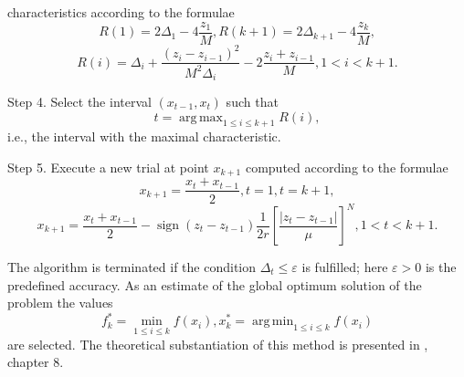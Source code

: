 \documentclass[procedia]{easychair}
\DeclareMathOperator*{\argmax}{arg\,max}
\DeclareMathOperator*{\argmin}{arg\,min}
\DeclareMathOperator{\sign}{sign}
\begin{document}
characteristics according to the formulae
\begin{equation}
\label{step3_1}
R(1)=2\Delta_1-4\dfrac{z_1}{M},R(k+1)=2\Delta_{k+1}-4\dfrac{z_k}{M},
\end{equation}
\begin{equation}
\label{step3_2}
R(i)=\Delta_i+\dfrac{(z_i-z_{i-1})^2}{M^2\Delta_i}-2\dfrac{z_i+z_{i-1}}{M},1<i<k+1.
\end{equation}
\par
Step 4. Select the interval \((x_{t-1}, x_t)\) such that
\begin{equation}
\label{step4}
t=\argmax_{1\leqslant i \leqslant k+1}R(i),
\end{equation}
i.e., the interval with the maximal characteristic.
\par
Step 5. Execute a new trial at point \(x_{k+1}\) computed according to the formulae
\begin{displaymath}
x_{k+1}=\dfrac{x_{t}+x_{t-1}}{2},t=1,t=k+1,
\end{displaymath}
\begin{equation}
\label{step5}
x_{k+1}=\dfrac{x_{t}+x_{t-1}}{2}-\sign(z_{t}-z_{t-1})\dfrac{1}{2r}\left[\dfrac{|z_{t}-z_{t-1}|}{\mu}\right]^N,1<t<k+1.
\end{equation}
\par
The algorithm is terminated if the condition \(\Delta_{t}\leqslant \varepsilon\) is fulfilled;
here \(\varepsilon>0\) is the predefined accuracy. As an estimate of the global optimum solution of the problem the values
\begin{equation}
f_k^*=\min_{1\leqslant i \leqslant k}f(x_i), x_k^*=\argmin_{1\leqslant i \leqslant k}f(x_i)
\end{equation}
are selected. The theoretical substantiation of this method is presented in \cite{strOptBook}, chapter 8.

\end{document}

